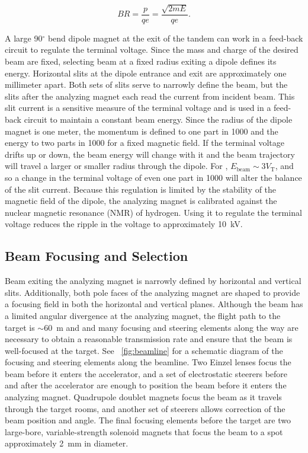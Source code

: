 \begin{equation}
BR = \frac{p}{qe} = \frac{\sqrt{2mE}}{qe}.
\label{eqn:rigidity}
\end{equation}

A large 90$^{\circ}$ bend dipole magnet at the exit of the tandem can work in a feed-back circuit to regulate the terminal voltage.  Since the mass and charge of the desired beam are fixed, selecting beam at a fixed radius exiting a dipole defines its energy.  Horizontal slits at the dipole entrance and exit are approximately one millimeter apart.  Both sets of slits serve to narrowly define the beam, but the slits after the analyzing magnet each read the current from incident beam.  This slit current is a sensitive measure of the terminal voltage and is used in a feed-back circuit to maintain a constant beam energy.  Since the radius of the dipole magnet is one meter, the momentum is defined to one part in 1000 and the energy to two parts in 1000 for a fixed magnetic field.  If the terminal voltage drifts up or down, the beam energy will change with it and the beam trajectory will travel a larger or smaller radius through the dipole.  For , $E_{\text{beam}}\sim3V_{\text{T}}$, and so a change in the terminal voltage of even one part in 1000 will alter the balance of the slit current.  Because this regulation is limited by the stability of the magnetic field of the dipole, the analyzing magnet is calibrated against the nuclear magnetic resonance (NMR) of hydrogen.  Using it to regulate the terminal voltage reduces the ripple in the voltage to approximately 10~kV.


\subsection{Beam Focusing and Selection}

Beam exiting the analyzing magnet is narrowly defined by horizontal and vertical slits.  Additionally, both pole faces of the analyzing magnet are shaped to provide a focusing field in both the horizontal and vertical planes.  Although the beam has a limited angular divergence at the analyzing magnet, the flight path to the target is $\sim60$~m and and many focusing and steering elements along the way are necessary to obtain a reasonable transmission rate and ensure that the beam is well-focused at the target.  See {\fig}~\ref{fig:beamline} for a schematic diagram of the focusing and steering elements along the beamline.  Two Einzel lenses \citep{BeamOptics} focus the beam before it enters the accelerator, and a set of electrostatic steerers before and after the accelerator are enough to position the beam before it enters the analyzing magnet.  Quadrupole doublet magnets focus the beam as it travels through the target rooms, and another set of steerers allows correction of the beam position and angle.  The final focusing elements before the target are two large-bore, variable-strength solenoid magnets \citep{TwinSol} that focus the beam to a spot approximately 2~mm in diameter.


